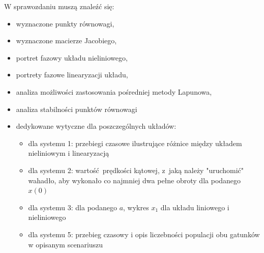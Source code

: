 \documentclass{sprawozdanie-agh}
\begin{document}
    W sprawozdaniu muszą znaleźć się:
    \begin{itemize}
        \item wyznaczone punkty równowagi,
        \item wyznaczone macierze Jacobiego,
        \item portret fazowy układu nieliniowego,
        \item portrety fazowe linearyzacji układu,
        \item analiza możliwości zastosowania pośredniej metody Lapunowa,
        \item analiza stabilności punktów równowagi
        \item dedykowane wytyczne dla poszczególnych układów:
        \begin{itemize}
            \item dla systemu 1: przebiegi czasowe ilustrujące różnice między układem nieliniowym i linearyzacją
            \item dla systemu 2: wartość prędkości kątowej, z~jaką należy "uruchomić" wahadło, aby wykonało co najmniej dwa pełne obroty dla podanego $x(0)$
            \item dla systemu 3: dla podanego $a$, wykres $x_1$ dla układu liniowego i nieliniowego
            \item dla systemu 5: przebieg czasowy i opis liczebności populacji obu gatunków w opisanym scenariuszu     
        \end{itemize}
    \end{itemize}
\end{document}
